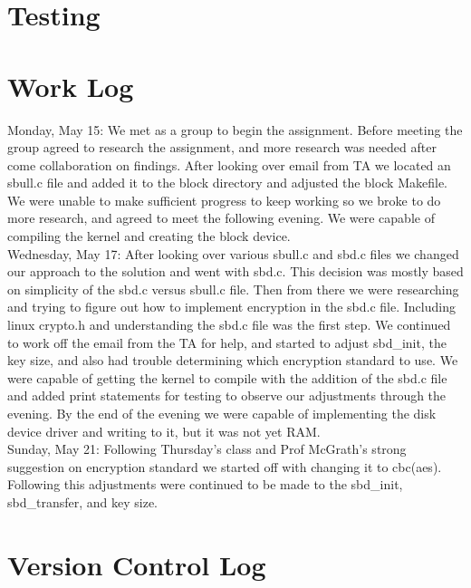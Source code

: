 \documentclass[letterpaper,10pt,serif,draftclsnofoot,onecolumn,compsoc,titlepage]{IEEEtran}
\begin{document}
\section{Testing}

\section{Work Log}
Monday, May 15: We met as a group to begin the assignment. Before meeting the group agreed to research the assignment, and more research was needed after come collaboration on findings. After looking over email from TA we located an sbull.c file and added it to the block directory and adjusted the block Makefile. We were unable to make sufficient progress to keep working so we broke to do more research, and agreed to meet the following evening. We were capable of compiling the kernel and creating the block device. \\
Wednesday, May 17: After looking over various sbull.c and sbd.c files we changed our approach to the solution and went with sbd.c. This decision was mostly based on simplicity of the sbd.c versus sbull.c file. Then from there we were researching and trying to figure out how to implement encryption in the sbd.c file. Including linux crypto.h and understanding the sbd.c file was the first step. We continued to work off the email from the TA for help, and started to adjust sbd\_init, the key size, and also had trouble determining which encryption standard to use. We were capable of getting the kernel to compile with the addition of the sbd.c file and added print statements for testing to observe our adjustments through the evening. By the end of the evening we were capable of implementing the disk device driver and writing to it, but it was not yet RAM. \\
Sunday, May 21: Following Thursday's class and Prof McGrath's strong suggestion on encryption standard we started off with changing it to cbc(aes). Following this adjustments were continued to be made to the sbd\_init, sbd\_transfer, and key size. \\

\section{Version Control Log}
\end{document}
